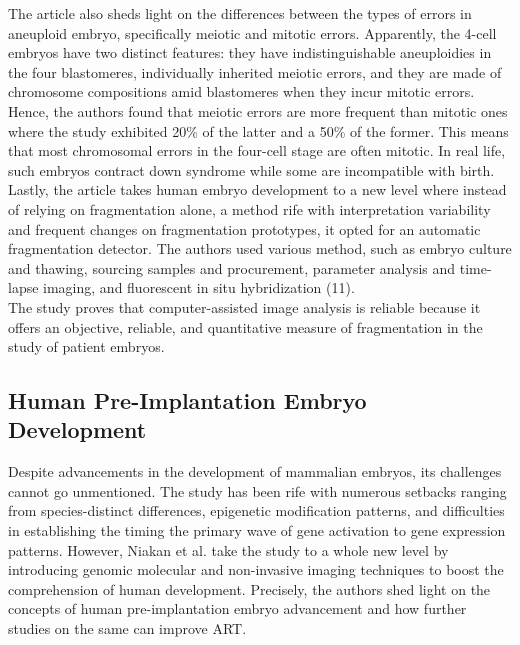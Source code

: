 \documentclass[12pt]{article}
\begin{document}
\noindent \qquad The article also sheds light on the differences between the types of errors in aneuploid embryo, specifically meiotic and mitotic errors. Apparently, the 4-cell embryos have two distinct features: they have indistinguishable aneuploidies in the four blastomeres, individually inherited meiotic errors, and they are made of chromosome compositions amid blastomeres when they incur mitotic errors.  Hence, the authors found that meiotic errors are more frequent than mitotic ones where the study exhibited 20\% of the latter and a 50\% of the former. This means that most chromosomal errors in the four-cell stage are often mitotic. In real life, such embryos contract down syndrome while some are incompatible with birth.\\

\noindent \qquad Lastly, the article takes human embryo development to a new level where instead of relying on fragmentation alone, a method rife with interpretation variability and frequent changes on fragmentation prototypes, it opted for an automatic fragmentation detector. The authors used various method, such as embryo culture and thawing, sourcing samples and procurement, parameter analysis and time-lapse imaging, and fluorescent in situ hybridization (11). \\

\noindent \qquad The study proves that computer-assisted image analysis is reliable because it offers an objective, reliable, and quantitative measure of fragmentation in the study of patient embryos. 

\subsection{Human Pre-Implantation Embryo Development}

\qquad Despite advancements in the development of mammalian embryos, its challenges cannot go unmentioned. The study has been rife with numerous setbacks ranging from species-distinct differences, epigenetic modification patterns, and difficulties in establishing the timing the primary wave of gene activation to gene expression patterns. However, Niakan et al. take the study to a whole new level by introducing genomic molecular and non-invasive imaging techniques to boost the comprehension of human development. Precisely, the authors shed light on the concepts of human pre-implantation embryo advancement and how further studies on the same can improve ART. \\
\end{document}
